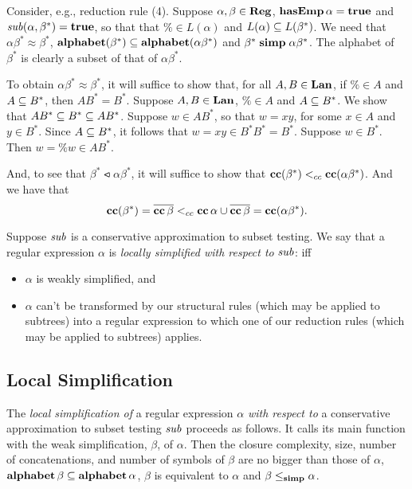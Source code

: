 Consider, e.g., reduction rule (4). Suppose $\alpha, \beta\in\mathbf{Reg}$,
$\mathbf{hasEmp}\,\alpha=\mathbf{true}$ and ${\it sub}(\alpha,\beta^*)=\mathbf{true}$, so that that
$\%\in L(\alpha)$ and $L(\alpha)\subseteq L(\beta^*)$.  We need that
$\alpha\beta^* \approx \beta^*$,
$\mathbf{alphabet}(\beta^*)\subseteq\mathbf{alphabet}(\alpha\beta^*)$ and
$\beta^*\mathrel{\mathbf{simp}}\alpha\beta^*$.  The alphabet of $\beta^*$ is clearly a
subset of that of $\alpha\beta^*$.

To obtain $\alpha\beta^* \approx \beta^*$, it will suffice to show
that, for all $A,B\in\mathbf{Lan}$, if $\%\in A$ and $A\subseteq B^*$, then
$AB^*=B^*$.  Suppose $A,B\in\mathbf{Lan}$, $\%\in A$ and $A\subseteq B^*$.
We show that $AB^*\subseteq B^*\subseteq AB^*$.  Suppose $w\in AB^*$, so
that $w=xy$, for some $x\in A$ and $y\in B^*$.  Since $A\subseteq B^*$,
it follows that $w=xy\in B^*B^*=B^*$.  Suppose $w\in B^*$.
Then $w=\%w\in AB^*$.

And, to see that $\beta^*\ltcc\alpha\beta^*$, it will suffice to
show that $\mathbf{cc}(\beta^*)\mathrel{<_{cc}}\mathbf{cc}(\alpha\beta^*)$.  And we
have that
\begin{displaymath}
 \mathbf{cc}(\beta^*) = \overline{\mathbf{cc}\,\beta} \mathrel{<_{cc}}
 \mathbf{cc}\,\alpha \cup \overline{\mathbf{cc}\,\beta} = \mathbf{cc}(\alpha\beta^*) .
\end{displaymath}

Suppose ${\it sub}$ is a conservative approximation to subset testing.
%
We say that a regular expression $\alpha$ is \emph{locally simplified with
respect to} ${\it sub}$:
iff
\begin{itemize}
\item $\alpha$ is weakly simplified, and

\item $\alpha$ can't be transformed by our structural rules (which may
  be applied to subtrees) into a regular expression to which one of
  our reduction rules (which may be applied to subtrees) applies.
\end{itemize}

\subsection*{Local Simplification}

%
%
%
The \emph{local simplification of} a regular expression $\alpha$
\emph{with respect to} a conservative approximation to subset testing
${\it sub}$ proceeds as follows.  It calls its main function with the weak
simplification, $\beta$, of $\alpha$. Then the closure complexity,
size, number of concatenations, and number of symbols of $\beta$ are
no bigger than those of $\alpha$,
$\mathbf{alphabet}\,\beta\subseteq\mathbf{alphabet}\,\alpha$,
$\beta$ is equivalent to $\alpha$ and $\beta\mathrel{\leq_{\mathbf{simp}}}\alpha$.

